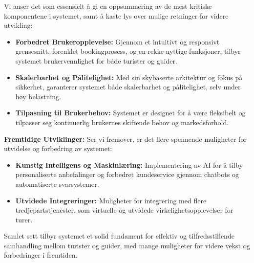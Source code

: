 \documentclass[../doc.tex]{subfiles}
\begin{document}
Vi anser det som essensielt å gi en oppsummering av de mest kritiske komponentene i systemet, samt å kaste lys over mulige retninger for videre utvikling:
\begin{itemize}
    \item \textbf{Forbedret Brukeropplevelse:} Gjennom et intuitivt og responsivt grensesnitt, forenklet bookingprosess, og en rekke nyttige funksjoner, tilbyr systemet brukervennlighet for både turister og guider.
    
    \item \textbf{Skalerbarhet og Pålitelighet:} Med sin skybaserte arkitektur og fokus på sikkerhet, garanterer systemet både skalerbarhet og pålitelighet, selv under høy belastning.
    
    \item \textbf{Tilpasning til Brukerbehov:} Systemet er designet for å være fleksibelt og tilpasser seg kontinuerlig brukernes skiftende behov og markedsforhold.
\end{itemize}

\textbf{Fremtidige Utviklinger:}
Ser vi fremover, er det flere spennende muligheter for utvidelse og forbedring av systemet:

\begin{itemize}
    \item \textbf{Kunstig Intelligens og Maskinlæring:} Implementering av AI for å tilby personaliserte anbefalinger og forbedret kundeservice gjennom chatbots og automatiserte svarsystemer.
    
    \item \textbf{Utvidede Integreringer:} Muligheter for integrering med flere tredjepartstjenester, som virtuelle og utvidede virkelighetsopplevelser for turer.
        
\end{itemize}

Samlet sett tilbyr systemet et solid fundament for effektiv og tilfredsstillende samhandling mellom turister og guider, med mange muligheter for videre vekst og forbedringer i fremtiden.
\end{document}
